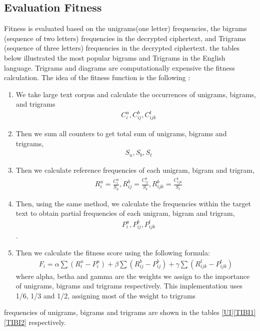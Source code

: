\subsection{Evaluation Fitness}
Fitness is evaluated based on the unigrams(one letter) frequencies, the bigrams (sequence of two letters) frequencies in the decrypted ciphertext, and Trigrams (sequence of three letters) frequencies in the decrypted ciphertext. the tables below illustrated the most popular bigrams and Trigrams in the English language. Trigrams and diagrams are computationally expensive the fitness calculation. The idea of the fitness function is the following \cite{Text_fitness}:
\begin{enumerate}
    \item{We take large text corpus and calculate the occurrences of unigrams, bigrams, and trigrams \begin{align*}& C^u_i, C^b_{ij}, C^t_{ijk} \end{align*}}
    \item{Then we sum all counters to get total sum of unigrams, bigrams and trigrams, \begin{align*}& S_u, S_b, S_t\end{align*}}
    \item{Then we calculate reference frequencies of each unigram, bigram and trigram,\begin{align*}& R^u_i = \frac{C^u_i}{S_u},R^b_{ij} = \frac{C^b_{ij}}{S_b},R^b_{ijk} =\frac{C^t_{ijk}}{S_t}\end{align*} }
    \item{Then, using the same method, we calculate the frequencies within the target text to obtain partial frequencies of each unigram, bigram and trigram, \begin{align*}& P^u_i, P^b_{ij}, P^t_{ijk} \end{align*} }.
    \item{Then we calculate the fitness score using the following formula:
    \begin{align*}
        F_i=\alpha \sum(R^u_i-P^u_i)+\beta \sum(R^b_{ij}-P^b_{ij})+\gamma \sum(R^t_{ijk}-P^t_{ijk})
    \end{align*}
where alpha, betha and gamma are the weights we assign to the importance of unigrams, bigrams and trigrams respectively. This implementation uses 1/6, 1/3 and 1/2, assigning most of the weight to trigrams}
\end{enumerate}
frequencies of unigrams, bigrams and trigrams are shown in the tables \ref{UI}\ref{TIBI1}\ref{TIBI2} respectively.
